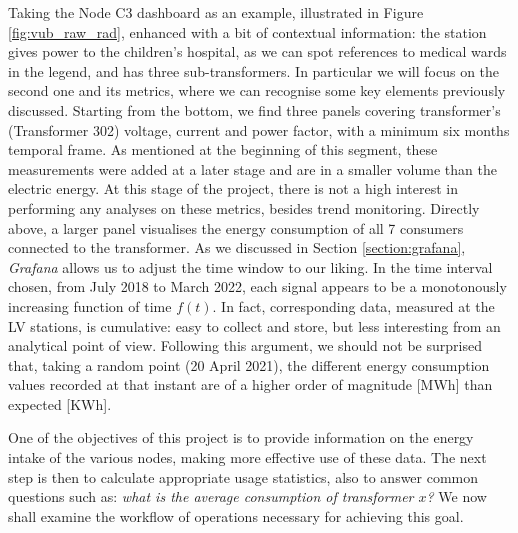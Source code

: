 Taking the Node C3 dashboard as an example, illustrated in Figure \ref{fig:vub_raw_rad}, enhanced with a bit of contextual information: 
the station gives power to the children's hospital, as we can spot references to medical wards in the legend, and has three sub-transformers.
In particular we will focus on the second one and its metrics, where we can recognise some key elements previously discussed.
Starting from the bottom, we find three panels covering transformer's (Transformer 302) voltage, current and power factor, with a minimum six months temporal frame.
As mentioned at the beginning of this segment, these measurements were added at a later stage and are in a smaller volume than the electric energy. 
At this stage of the project, there is not a high interest in performing any analyses on these metrics, besides trend monitoring. 
Directly above, a larger panel visualises the energy consumption of all 7 consumers connected to the transformer.
As we discussed in Section \ref{section:grafana}, \textit{Grafana} allows us to adjust the time window to our liking.
In the time interval chosen, from July 2018 to March 2022, each signal appears to be a monotonously increasing function of time $f(t)$. 
In fact, corresponding data, measured at the \ac{LV} stations, is cumulative: easy to collect and store, but less interesting from an analytical point of view. 
Following this argument, we should not be surprised that, taking a random point (20 April 2021), the different energy consumption values recorded at that instant 
are of a higher order of magnitude [MWh] than expected [KWh].

One of the objectives of this project is to provide information on the energy intake of the various nodes, making more effective use of these data. 
The next step is then to calculate appropriate usage statistics, also to answer common questions such as: \textit{what is the average consumption of transformer $x$?}
We now shall examine the workflow of operations necessary for achieving this goal.

